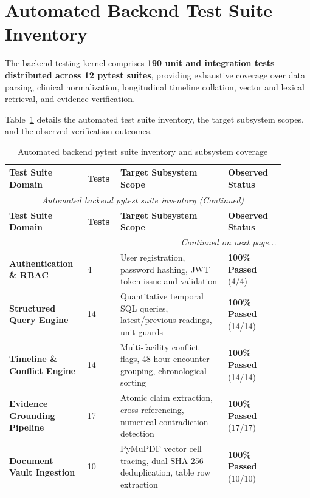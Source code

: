 \section{Automated Backend Test Suite Inventory}
\label{sec:automated_test_inventory}

The backend testing kernel comprises \textbf{190 unit and integration tests distributed across 12 pytest suites}, providing exhaustive coverage over data parsing, clinical normalization, longitudinal timeline collation, vector and lexical retrieval, and evidence verification.

Table~\ref{tab:7_1_suites} details the automated test suite inventory, the target subsystem scopes, and the observed verification outcomes.

\small
\begin{longtable}{@{}p{0.25\linewidth} p{0.10\linewidth} p{0.36\linewidth} p{0.19\linewidth}@{}}
\caption{Automated backend pytest suite inventory and subsystem coverage}\label{tab:7_1_suites} \\
\toprule
\textbf{Test Suite Domain} & \textbf{Tests} & \textbf{Target Subsystem Scope} & \textbf{Observed Status} \\
\midrule
\endfirsthead
\toprule
\multicolumn{4}{c}{\small\textit{Automated backend pytest suite inventory (Continued)}} \\[4pt]
\midrule
\textbf{Test Suite Domain} & \textbf{Tests} & \textbf{Target Subsystem Scope} & \textbf{Observed Status} \\
\midrule
\endhead
\midrule
\multicolumn{4}{r}{\footnotesize\textit{Continued on next page...}} \\
\bottomrule
\endfoot
\bottomrule
\endlastfoot
\textbf{Authentication \& RBAC} & 4 & User registration, password hashing, JWT token issue and validation & \textbf{100\% Passed} (4/4) \\
\textbf{Structured Query Engine} & 14 & Quantitative temporal SQL queries, latest/previous readings, unit guards & \textbf{100\% Passed} (14/14) \\
\textbf{Timeline \& Conflict Engine} & 14 & Multi-facility conflict flags, 48-hour encounter grouping, chronological sorting & \textbf{100\% Passed} (14/14) \\
\textbf{Evidence Grounding Pipeline} & 17 & Atomic claim extraction, cross-referencing, numerical contradiction detection & \textbf{100\% Passed} (17/17) \\
\textbf{Document Vault Ingestion} & 10 & PyMuPDF vector cell tracing, dual SHA-256 deduplication, table row extraction & \textbf{100\% Passed} (10/10) \\

\end{longtable}
